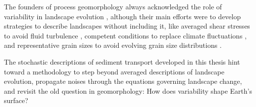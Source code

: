 The founders of process geomorphology always acknowledged the role of variability in landscape evolution \citep{Horton1945,Strahler1952,Langbein1964}, although their main efforts were to develop strategies to describe landscapes without including it, like averaged shear stresses to avoid fluid turbulence \citep{MeyerPeter1948,Bagnold1954}, competent conditions to replace climate fluctuations \citep{Wolman1959,Wolman1978}, and representative grain sizes to avoid evolving grain size distributions \citep{Parker1982,Andrews1983}.

The stochastic descriptions of sediment transport developed in this thesis hint toward a methodology to step beyond averaged descriptions of landscape evolution, propagate noises through the equations governing landscape change, and revisit the old question in geomorphology: How does variability shape Earth's surface?

\endinput

Its closest neighbours may be rarefied hillslope transport, where solitary grains tumble down hillslopes \citep{Williams2021}, and intense bedload transport, where particles creep downstream in a dense granular flow, supported by collisions with other moving grains \citep{Frey2014}. These phenomena differ only by viscosity or density, not mechanically. 



\citet{Ashworth1989} and \citet{Warburton1992} identified three phases of bedload transport in gravel-bed streams that occur as the flow increases. Phase 1 is characterized by movement of sand only, while gravel remains stationary; phase 2 involves partial mobility of the smaller gravel sizes; and phase 3 is the full mobility of all grain sizes represented on the bed.
Phase 2 is most common in gravel-bed rivers, but phase 3 has 